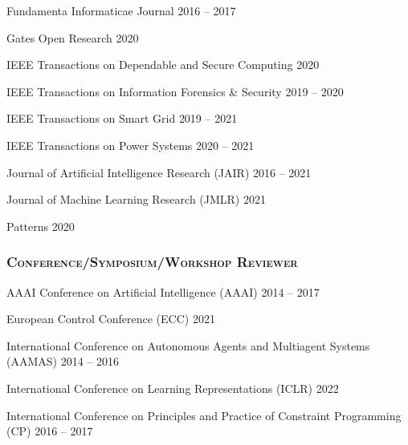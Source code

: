   \item Fundamenta Informaticae Journal \hfill{2016 -- 2017}

  \item Gates Open Research \hfill{2020}

  \item IEEE Transactions on Dependable and Secure Computing \hfill{2020}

  \item IEEE Transactions on Information Forensics \& Security \hfill{2019 -- 2020}

  \item IEEE Transactions on Smart Grid \hfill{2019 -- 2021}

  \item IEEE Transactions on Power Systems \hfill{2020 -- 2021}

  \item Journal of Artificial Intelligence Research (JAIR) \hfill{2016 -- 2021}

  \item Journal of Machine Learning Research (JMLR) \hfill{2021}
  
  \item Patterns \hfill{2020}
\endList


\subsubsection*{\scshape Conference/Symposium/Workshop Reviewer}{}{}{}
\beginList
  
  \item AAAI Conference on Artificial Intelligence (AAAI) \hfill {2014 -- 2017}
  
  \item European Control Conference (ECC) \hfill 2021

  \item International Conference on Autonomous Agents and Multiagent Systems (AAMAS) \hfill {2014 -- 2016}
  
  \item International Conference on Learning Representations (ICLR)
  \hfill{2022}
  
  \item International Conference on Principles and Practice of Constraint Programming (CP) \hfill{2016 -- 2017} 
  
